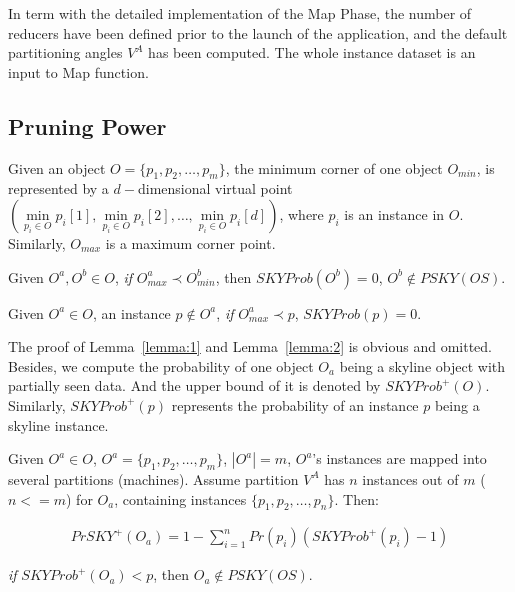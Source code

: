 In term with the detailed implementation of the Map Phase, the number of reducers have been defined prior to the launch of the application, and the default partitioning angles $V^A$ has been computed. The whole instance dataset is an input to Map function. 


\subsection{Pruning Power}
Given an object $O = \{p_1, p_2, \dots, p_m\}$, the minimum corner of one object $O_{min}$, is represented by a $d-$dimensional virtual point $( \min\limits_{p_i \in O}p_i[1], \min\limits_{p_i \in O}p_i[2], \dots, \min\limits_{p_i \in O}p_i[d])$, where $p_i$ is an instance in $O$. Similarly, $O_{max}$ is a maximum corner point.

\vspace{5 mm}
\begin{lemma}
\label{lemma:1}
Given $O^a, O^b \in O$, \emph{if} $O^a_{max} \prec O^b_{min}$, then $SKYProb(O^b) = 0$, $O^b \notin PSKY(OS)$.
\end{lemma}

\vspace{5 mm}

\begin{lemma}
\label{lemma:2}
Given $O^a \in O$, an instance $p \notin O^a$, \emph{if} $O^a_{max} \prec p$, $SKYProb(p) = 0$.
\end{lemma}

\vspace{5 mm}

The proof of Lemma~\ref{lemma:1} and Lemma~\ref{lemma:2} is obvious and omitted.
Besides, we compute the probability of one object $O_a$ being a skyline object with partially seen data. And the upper bound of it is denoted by $SKYProb^{+}(O)$. Similarly, $SKYProb^{+}(p)$ represents the probability of an instance $p$ being a skyline instance.

\vspace{5 mm}

\begin{lemma}
\label{lemma:3}
Given $O^a \in O$, $O^a=\{p_1, p_2, \dots, p_m\}$, $|O^a| = m$, $O^a$'s instances are mapped into several partitions (machines). Assume partition $V^A$ has $n$ instances out of $m$ ($n<=m$) for $O_a$, containing instances $\{p_1, p_2, \dots, p_n\}$. Then:

\begin{equation}
\label{objectUpper}
    \begin{aligned}
PrSKY^{+}(O_a) = 1 - \sum\limits_{i=1}^n Pr(p_i)(SKYProb^+(p_i)-1)
    \end{aligned}
\end{equation}

\emph{if} $SKYProb^{+}(O_a) < p$, then $O_a \notin PSKY(OS)$.

\end{lemma}

